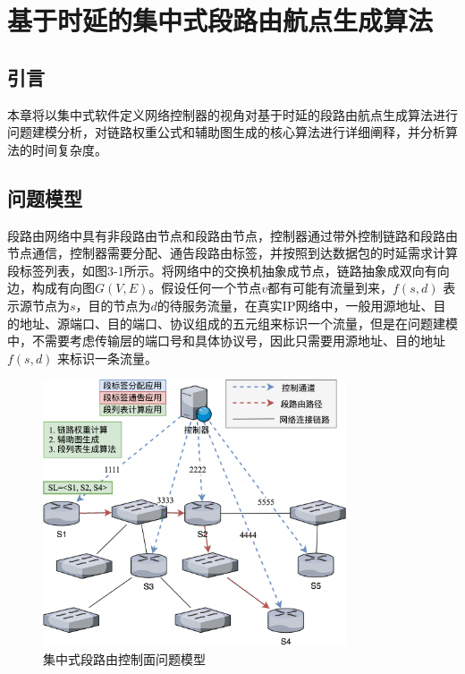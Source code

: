 \chapter{基于时延的集中式段路由航点生成算法}

\section{引言}

本章将以集中式软件定义网络控制器的视角对基于时延的段路由航点生成算法进行问题建模分析，对链路权重公式和辅助图生成的核心算法进行详细阐释，并分析算法的时间复杂度。

\section{问题模型}

段路由网络中具有非段路由节点和段路由节点，控制器通过带外控制链路和段路由节点通信，控制器需要分配、通告段路由标签，并按照到达数据包的时延需求计算段标签列表，如图3-1所示。将网络中的交换机抽象成节点，链路抽象成双向有向边，构成有向图$G(V, E)$。假设任何一个节点$v$都有可能有流量到来，$f(s, d)$ 表示源节点为$s$，目的节点为$d$的待服务流量，在真实IP网络中，一般用源地址、目的地址、源端口、目的端口、协议组成的五元组来标识一个流量，但是在问题建模中，不需要考虑传输层的端口号和具体协议号，因此只需要用源地址、目的地址 $f(s, d)$ 来标识一条流量。

\begin{figure}[htbp]
\setlength{\abovecaptionskip}{15pt plus 3pt minus 2pt}
\centerline{\includegraphics[width=0.8\textwidth]{./figures/ch3-problem-model.png}}
\caption{集中式段路由控制面问题模型}
\label{fig-ch3-problem-model}
\end{figure}


